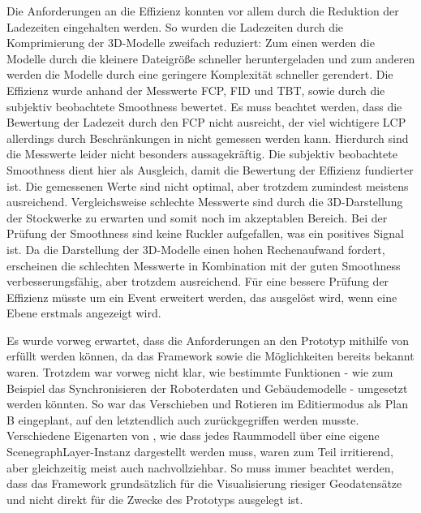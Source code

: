 Die Anforderungen an die Effizienz konnten vor allem durch die Reduktion der Ladezeiten eingehalten werden. So wurden die Ladezeiten durch die Komprimierung der 3D-Modelle zweifach reduziert: Zum einen werden die Modelle durch die kleinere Dateigröße schneller heruntergeladen und zum anderen werden die Modelle durch eine geringere Komplexität schneller gerendert. Die Effizienz wurde anhand der Messwerte \ac{FCP}, \ac{FID} und \ac{TBT}, sowie durch die subjektiv beobachtete Smoothness bewertet. Es muss beachtet werden, dass die Bewertung der Ladezeit durch den \ac{FCP} nicht ausreicht, der viel wichtigere \ac{LCP} allerdings durch Beschränkungen in \deckgl{} nicht gemessen werden kann. Hierdurch sind die Messwerte leider nicht besonders aussagekräftig. Die subjektiv beobachtete Smoothness dient hier als Ausgleich, damit die Bewertung der Effizienz fundierter ist. Die gemessenen Werte sind nicht optimal, aber trotzdem zumindest meistens ausreichend. Vergleichsweise schlechte Messwerte sind durch die 3D-Darstellung der Stockwerke zu erwarten und somit noch im akzeptablen Bereich. Bei der Prüfung der Smoothness sind keine Ruckler aufgefallen, was ein positives Signal ist. Da die Darstellung der 3D-Modelle einen hohen Rechenaufwand fordert, erscheinen die schlechten Messwerte in Kombination mit der guten Smoothness verbesserungsfähig, aber trotzdem ausreichend. Für eine bessere Prüfung der Effizienz müsste \deckgl{} um ein Event erweitert werden, das ausgelöst wird, wenn eine Ebene erstmals angezeigt wird.

Es wurde vorweg erwartet, dass die Anforderungen an den Prototyp mithilfe von \deckgl{} erfüllt werden können, da das Framework sowie die Möglichkeiten bereits bekannt waren. Trotzdem war vorweg nicht klar, wie bestimmte Funktionen - wie zum Beispiel das Synchronisieren der Roboterdaten und Gebäudemodelle - umgesetzt werden könnten. So war das Verschieben und Rotieren im Editiermodus als Plan B eingeplant, auf den letztendlich auch zurückgegriffen werden musste. Verschiedene Eigenarten von \deckgl{}, wie dass jedes Raummodell über eine eigene ScenegraphLayer-Instanz dargestellt werden muss, waren zum Teil irritierend, aber gleichzeitig meist auch nachvollziehbar. So muss immer beachtet werden, dass das Framework grundsätzlich für die Visualisierung riesiger Geodatensätze und nicht direkt für die Zwecke des Prototyps ausgelegt ist.

